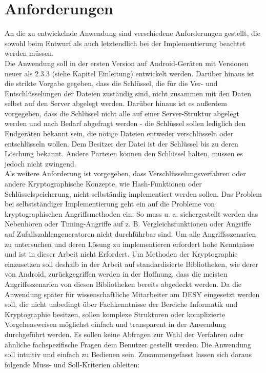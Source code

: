 \documentclass[10pt, a4paper,headsepline]{scrreprt}
\begin{document}
\section{Anforderungen}
An die zu entwickelnde Anwendung sind verschiedene Anforderungen gestellt, die sowohl beim Entwurf als auch letztendlich bei der Implementierung beachtet werden müssen. \\
Die Anwendung soll in der ersten Version auf Android-Geräten mit Versionen neuer als 2.3.3 (siehe Kapitel Einleitung) entwickelt werden. Darüber hinaus ist die strikte Vorgabe gegeben, dass die Schlüssel, die für die Ver- und Entschlüsselungen der Dateien zuständig sind, nicht zusammen mit den Daten selbst auf den Server abgelegt werden. Darüber hinaus ist es außerdem vorgegeben, dass die Schlüssel nicht alle auf einer Server-Struktur abgelegt werden und nach Bedarf abgefragt werden - die Schlüssel sollen lediglich den Endgeräten bekannt sein, die nötige Dateien entweder verschlüsseln oder entschlüsseln wollen. Dem Besitzer der Datei ist der Schlüssel bis zu deren Löschung bekannt. Andere Parteien können den Schlüssel halten, müssen es jedoch nicht zwingend. \\
Als weitere Anforderung ist vorgegeben, dass Verschlüsselungsverfahren oder andere Kryptographische Konzepte, wie Hash-Funktionen oder Schlüsselspeicherung, nicht selbständig implementiert werden sollen. Das Problem bei selbstständiger Implementierung geht ein auf die Probleme von kryptographischen Angriffsmethoden ein. So muss u. a. sichergestellt werden das Nebenhören oder Timing-Angriffe auf z. B. Vergleichsfunktionen oder Angriffe auf Zufallszahlengeneratoren nicht durchführbar sind. Um alle Angriffsszenarien zu untersuchen und deren Lösung zu implementieren erfordert hohe Kenntnisse und ist in dieser Arbeit nicht Erfordert. Um Methoden der Kryptographie einzusetzen soll deshalb in der Arbeit auf standardisierte Bibliotheken, wie derer von Android, zurückgegriffen werden in der Hoffnung, dass die meisten Angriffsszenarien von diesen Bibliotheken bereits abgedeckt werden. Da die Anwendung später für wissenschaftliche Mitarbeiter am DESY eingesetzt werden soll, die nicht unbedingt über Fachkenntnisse der Bereiche Informatik und Kryptographie besitzen, sollen komplexe Strukturen oder komplizierte Vorgehensweisen möglichst einfach und transparent in der Anwendung durchgeführt werden. Es sollen keine Abfragen zur Wahl der Verfahren oder ähnliche fachspezifische Fragen dem Benutzer gestellt werden. Die Anwendung soll intuitiv und einfach zu Bedienen sein. Zusammengefasst lassen sich daraus folgende Muss- und Soll-Kriterien ableiten: \\ \\
\end{document}
